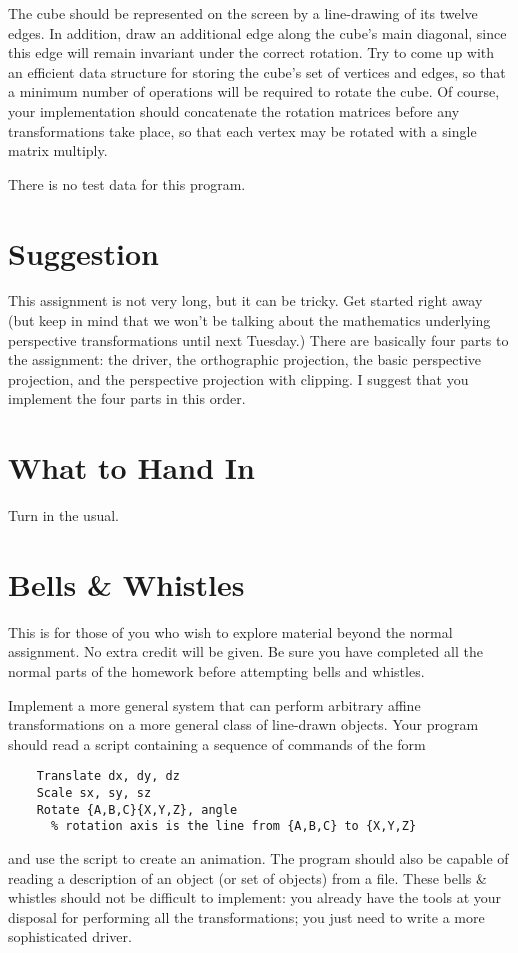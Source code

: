 The cube should be represented on the screen by a line-drawing of 
its twelve edges.  In addition, draw an additional edge along the 
cube's main diagonal, since this edge will remain invariant under 
the correct rotation.  Try to come up with an efficient data structure 
for storing the cube's set of vertices and edges, so that a minimum 
number of operations will be required to rotate the cube.  Of course, 
your implementation should concatenate the rotation matrices before 
any transformations take place, so that each vertex may be rotated 
with a single matrix multiply.

There is no test data for this program.

\section{Suggestion}

This assignment is not very long, but it can be tricky. Get started 
right away (but keep in mind that we won't be talking about the 
mathematics underlying perspective transformations until next Tuesday.) 
There are basically four parts to the assignment: the driver, the 
orthographic projection, the basic perspective projection, and the 
perspective projection with clipping. I suggest that you implement 
the four parts in this order.

\section{What to Hand In}

Turn in the usual. 


\section{Bells \& Whistles}

This is for those of you who wish to explore material beyond the 
normal assignment. No extra credit will be given.  Be sure you have 
completed all the normal parts of the homework before attempting 
bells and whistles.

Implement a more general system that can perform arbitrary affine 
transformations on a more general class of line-drawn objects.  Your 
program should read a script containing a sequence of commands of 
the form
\begin{verbatim}
    Translate dx, dy, dz
    Scale sx, sy, sz
    Rotate {A,B,C}{X,Y,Z}, angle
      % rotation axis is the line from {A,B,C} to {X,Y,Z}
\end{verbatim}
and use the script to create an animation. The program should
also be capable of reading a description of an object (or set of
objects) from a file.  These bells \& whistles should not be difficult
to implement:  you already have the tools at your disposal for
performing all the transformations; you just need to write a more
sophisticated driver.


